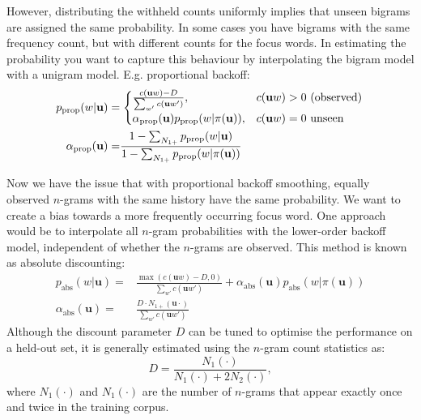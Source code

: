 However, distributing the withheld counts uniformly implies that unseen bigrams are assigned the same probability.
In some cases you have bigrams with the same frequency count, but with different counts for the focus words. In estimating the probability you want to capture this behaviour by interpolating the bigram model with a unigram model. E.g. proportional backoff:~
\begin{equation}\begin{split}
	p_{\operatorname{prop}}(w|\mathbf{u})=&\left.
    \begin{cases}
    	\frac{c(\mathbf{u}w)-D}{\sum_{w'}c(\mathbf{u}w')}, & c(\mathbf{u}w) > 0\textnormal{ (observed)} \\
        \alpha_{\operatorname{prop}}(\mathbf{u})p_{\operatorname{prop}}(w|\pi(\mathbf{u})), & c(\mathbf{u}w) = 0\textnormal{ unseen}
    \end{cases}\right. \\
    \alpha_{\operatorname{prop}}(\mathbf{u}) =& \frac{1 - \sum_{N_{1+}}p_{\operatorname{prop}}(w|\mathbf{u})}{1 - \sum_{N_{1+}}p_{\operatorname{prop}}(w|\pi(\mathbf{u}))}
\end{split}\end{equation}

Now we have the issue that with proportional backoff smoothing, equally observed $n$-grams with the same history have the same probability. We want to create a bias towards a more frequently occurring focus word. One approach would be to interpolate all $n$-gram probabilities with the lower-order backoff model, independent of whether the $n$-grams are observed. This method is known as absolute discounting\cite{ney1994structuring}:
\begin{equation}\begin{split}
p_{\operatorname{abs}}(w|\mathbf{u})=&\frac{\max(c(\mathbf{u}w)-D,0)}{\sum_{w'}c(\mathbf{u}w')} + \alpha_{\operatorname{abs}}(\mathbf{u})p_{\operatorname{abs}}(w|\pi(\mathbf{u})) \\
\alpha_{\operatorname{abs}}(\mathbf{u})=&\frac{D\cdot N_{1+}(\mathbf{u}\cdot)}{\sum_{w'}c(\mathbf{u}w')}
\end{split}\end{equation}
Although the discount parameter $D$ can be tuned to optimise the performance on a held-out set, it is generally estimated using the $n$-gram count statistics as:
\begin{equation}
D = \frac{N_{1}(\cdot)}{N_{1}(\cdot)+2N_{2}(\cdot)},
\end{equation}
where $N_{1}(\cdot)$ and $N_{1}(\cdot)$ are the number of $n$-grams that appear exactly once and twice in the training corpus.

